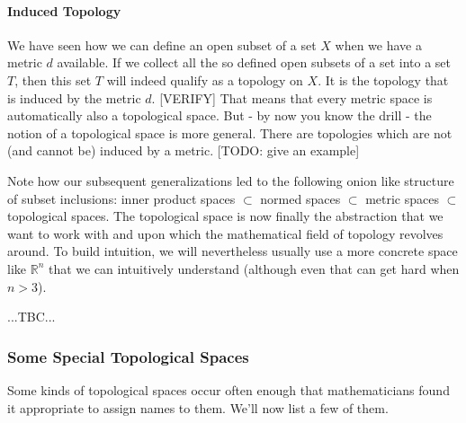\paragraph{Induced Topology} 
We have seen how we can define an open subset of a set $X$ when we have a metric $d$ available. If we collect all the so defined open subsets of a set into a set $T$, then this set $T$ will indeed qualify as a topology on $X$. It is the topology that is induced by the metric $d$. [VERIFY] That means that every metric space is automatically also a topological space. But - by now you know the drill - the notion of a topological space is more general. There are topologies which are not (and cannot be) induced by a metric. [TODO: give an example]


\medskip
Note how our subsequent generalizations led to the following onion like structure of subset inclusions: inner product spaces $\subset$ normed spaces $\subset$ metric spaces $\subset$ topological spaces. The topological space is now finally the abstraction that we want to work with and upon which the mathematical field of topology revolves around. To build intuition, we will nevertheless usually use a more concrete space like $\mathbb{R}^n$ that we can intuitively understand (although even that can get hard when $n > 3$).



...TBC...







\subsubsection{Some Special Topological Spaces}
Some kinds of topological spaces occur often enough that mathematicians found it appropriate to assign names to them. We'll now list a few of them.

